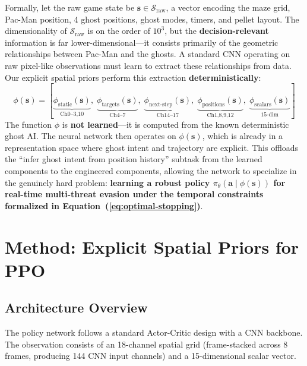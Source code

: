 \documentclass[11pt,a4paper]{article}
\theoremstyle{definition}
\begin{document}
Formally, let the raw game state be $\mathbf{s} \in \mathcal{S}_{\text{raw}}$, a vector encoding the maze grid, Pac-Man position, 4 ghost positions, ghost modes, timers, and pellet layout.
The dimensionality of $\mathcal{S}_{\text{raw}}$ is on the order of $10^3$, but the \textbf{decision-relevant} information is far lower-dimensional---it consists primarily of the geometric relationships between Pac-Man and the ghosts.
A standard CNN operating on raw pixel-like observations must learn to extract these relationships from data.
Our explicit spatial priors perform this extraction \textbf{deterministically}:
\begin{equation}
\phi(\mathbf{s}) = [\underbrace{\phi_{\text{static}}(\mathbf{s})}_{\text{Ch0--3,10}},\; \underbrace{\phi_{\text{targets}}(\mathbf{s})}_{\text{Ch4--7}},\; \underbrace{\phi_{\text{next-step}}(\mathbf{s})}_{\text{Ch14--17}},\; \underbrace{\phi_{\text{positions}}(\mathbf{s})}_{\text{Ch1,8,9,12}},\; \underbrace{\phi_{\text{scalars}}(\mathbf{s})}_{\text{15-dim}}]
\end{equation}
The function $\phi$ is \textbf{not learned}---it is computed from the known deterministic ghost AI.
The neural network then operates on $\phi(\mathbf{s})$, which is already in a representation space where ghost intent and trajectory are explicit.
This offloads the ``infer ghost intent from position history'' subtask from the learned components to the engineered components, allowing the network to specialize in the genuinely hard problem: \textbf{learning a robust policy $\pi_\theta(\mathbf{a} \mid \phi(\mathbf{s}))$ for real-time multi-threat evasion under the temporal constraints formalized in Equation~(\ref{eq:optimal-stopping})}.

\section{Method: Explicit Spatial Priors for PPO}
\label{sec:method}

\subsection{Architecture Overview}

The policy network follows a standard Actor-Critic design with a CNN backbone.
The observation consists of an 18-channel spatial grid (frame-stacked across 8 frames, producing 144 CNN input channels) and a 15-dimensional scalar vector.
\end{document}
